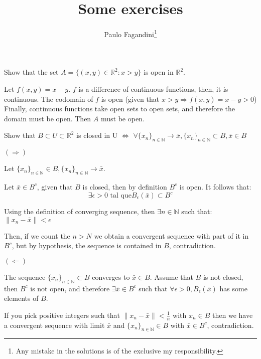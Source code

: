\documentclass[answers]{exam}
\title{Some exercises}
\author{Paulo Fagandini\thanks{Any mistake in the solutions is of the exclusive my responsibility.}}
\date{}
\theoremstyle{definition}
\begin{document}
\maketitle

\begin{questions}

    \question Show that the set $A=\{(x,y)\in\mathds{R}^2:x>y\}$ is open in $\mathds{R}^2$.

    \begin{solution}
        Let $f(x,y)=x-y$. $f$ is a difference of continuous functions, then, it is continuous. The codomain of $f$ is open (given that $x>y\Rightarrow f(x,y)=x-y>0$)
        Finally, continuous functions take open sets to open sets, and therefore the domain must be open. Then $A$ must be open.
    \end{solution}

    \question Show that $B\subset U \subset \mathds{R}^2$ is closed in U $\Leftrightarrow$ $\forall \{x_n\}_{n\in\mathds{N}}\rightarrow\bar{x},\{x_n\}_{n\in\mathds{N}}\subset B,\bar{x}\in B$
        
        \begin{solution}
        $(\Rightarrow)$
        
        Let $\{x_n\}_{n\in\mathds{N}} \in B, \{x_n\}_{n\in\mathds{N}}\rightarrow\bar{x}$.
        
        Let $\bar{x}\in B^c$, given that $B$ is closed, then by definition $B^c$ is open. It follows that:  $$\exists \epsilon>0 \text{ tal que} B_\epsilon(\bar{x})\subset B^c$$
        
        Using the definition of converging sequence, then $\exists n\in\mathds{N}$ such that: $\parallel x_n-\bar{x}\parallel<\epsilon$
        
        Then, if we count the $n>N$ we obtain a convergent sequence with part of it in $B^c$, but by hypothesis, the sequence is contained in $B$, contradiction.
        
        $(\Leftarrow)$
        
        The sequence $\{x_n\}_{n\in\mathds{N}}\subset B$ converges to $\bar{x}\in B$. Assume that $B$ is not closed, then $B^c$ is not open, and therefore $\exists \bar{x}\in B^c$ such that $\forall \epsilon>0, B_\epsilon(\bar{x})$ has some elements of $B$.
        
        If you pick positive integers such that $\parallel x_n-\bar{x}\parallel <\frac{1}{n}$ with $x_n\in B$ then we have a convergent sequence with limit $\bar{x}$ and
        $\{x_n\}_{n\in\mathds{N}}\in B$ with $\bar{x} \in B^c$, contradiction.
        \end{solution}


\end{questions}
\end{document}
